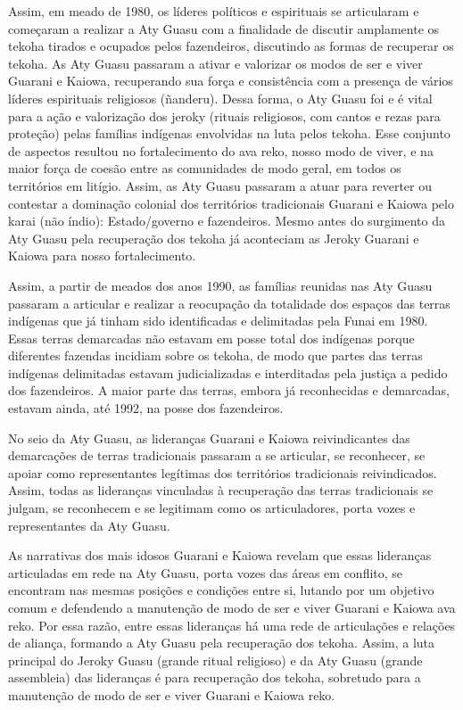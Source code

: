 \documentclass{article}
\begin{document}
Assim, em meado de 1980, os l\'ideres pol\'iticos e espirituais se
articularam e come\c{c}aram a realizar a Aty Guasu com a finalidade de
discutir amplamente os tekoha tirados e ocupados pelos fazendeiros,
discutindo as formas de recuperar os tekoha. As Aty Guasu passaram a
ativar e valorizar os modos de ser e viver Guarani e Kaiowa,
recuperando sua for\c{c}a e consist\^encia com a presen\c{c}a de
v\'arios l\'ideres espirituais religiosos (\~nanderu). Dessa forma, o
Aty Guasu foi e \'e vital para a a\c{c}\~ao e valoriza\c{c}\~ao dos
jeroky (rituais religiosos, com cantos e rezas para prote\c{c}\~ao)
pelas fam\'ilias ind\'igenas  envolvidas na luta pelos tekoha. Esse
conjunto de aspectos resultou no fortalecimento do ava reko, nosso modo
de viver, e na maior for\c{c}a de coes\~ao entre as comunidades de modo
geral, em todos os territ\'orios em lit\'igio. Assim, as Aty Guasu
passaram a atuar para reverter ou contestar a domina\c{c}\~ao colonial
dos territ\'orios tradicionais Guarani e Kaiowa pelo karai (n\~ao
\'indio): Estado/governo e fazendeiros. Mesmo antes do surgimento da
Aty Guasu pela recupera\c{c}\~ao dos tekoha j\'a aconteciam as Jeroky
Guarani e Kaiowa para nosso fortalecimento.

Assim, a partir de meados dos anos 1990, as fam\'ilias reunidas nas Aty
Guasu passaram a articular e realizar a reocupa\c{c}\~ao da totalidade
dos espa\c{c}os das terras ind\'igenas que j\'a tinham sido
identificadas e delimitadas pela Funai em 1980. Essas terras demarcadas
n\~ao estavam em posse total dos ind\'igenas porque diferentes fazendas
incidiam sobre os tekoha, de modo que partes das terras ind\'igenas
delimitadas estavam judicializadas e interditadas pela justi\c{c}a a
pedido dos fazendeiros. A maior parte das terras, embora j\'a
reconhecidas e demarcadas, estavam ainda, at\'e 1992, na posse dos
fazendeiros. 

No seio da Aty Guasu, as lideran\c{c}as Guarani e Kaiowa reivindicantes
das demarca\c{c}\~oes de terras tradicionais passaram a se articular,
se reconhecer, se apoiar como representantes leg\'itimas dos
territ\'orios tradicionais reivindicados. Assim, todas as
lideran\c{c}as vinculadas \`a recupera\c{c}\~ao das terras tradicionais
se julgam, se reconhecem e se legitimam como os articuladores, porta
vozes e representantes da Aty Guasu. 

As narrativas dos mais idosos Guarani e Kaiowa revelam que essas
lideran\c{c}as articuladas em rede na Aty Guasu, porta vozes das
\'areas em conflito, se encontram nas mesmas posi\c{c}\~oes e
condi\c{c}\~oes entre si, lutando por um objetivo comum e defendendo a
manuten\c{c}\~ao de modo de ser e viver Guarani e Kaiowa ava reko. Por
essa raz\~ao, entre essas lideran\c{c}as h\'a uma rede de
articula\c{c}\~oes e rela\c{c}\~oes de alian\c{c}a, formando a Aty
Guasu pela recupera\c{c}\~ao dos tekoha. Assim, a luta principal do
Jeroky Guasu (grande ritual religioso) e da Aty Guasu (grande
assembleia) das lideran\c{c}as \'e para recupera\c{c}\~ao dos tekoha,
sobretudo para a manuten\c{c}\~ao de modo de ser e viver Guarani e
Kaiowa reko.
\end{document}
